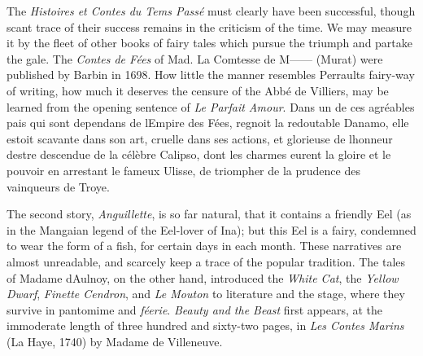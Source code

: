 \documentclass[14pt,a4paper]{memoir}
\begin{document}
{The \emph{Histoires et Contes du Tems Passé} must clearly have been
successful, though scant trace of their success remains in the criticism
of the
time.
We may measure it by the fleet of other books of fairy tales which
\textquotesingle pursue the triumph and partake the
gale.\textquotesingle{} The \emph{Contes de Fées} of Mad. La Comtesse de
M------ (Murat) were published by Barbin in 1698. How little the manner
resembles Perrault\textquotesingle s \textquotesingle fairy-way of
writing,\textquotesingle{} how much it deserves the censure of the Abbé
de Villiers, may be learned from the opening sentence of \emph{Le
Parfait Amour}. \textquotesingle Dans un de ces agréables pais qui sont
dependans de l\textquotesingle Empire des Fées, regnoit la redoutable
Danamo, elle estoit scavante dans son art, cruelle dans ses actions, et
glorieuse de l\textquotesingle honneur d\textquotesingle estre descendue
de la célèbre Calipso, dont les charmes eurent la gloire et le pouvoir
en arrestant le fameux Ulisse, de triompher de la prudence des
vainqueurs de Troye.\textquotesingle{}

The second story, \emph{Anguillette}, is so far natural, that it
contains a friendly Eel (as in the Mangaian legend of the Eel-lover of
Ina); but this Eel is a fairy, condemned to wear the form of a fish, for
certain days in each month. These narratives are almost unreadable, and
scarcely keep a trace of the popular tradition. The tales of Madame
d\textquotesingle Aulnoy, on the other hand, introduced the \emph{White
Cat}, the \emph{Yellow Dwarf}, \emph{Finette Cendron}, and \emph{Le
Mouton} to literature and the stage, where they survive in pantomime and
\emph{féerie}. \emph{Beauty and the Beast} first appears, at the
immoderate length of three hundred and sixty-two pages, in \emph{Les
Contes Marins} (La Haye, 1740) by Madame de Villeneuve.

}
\end{document}
